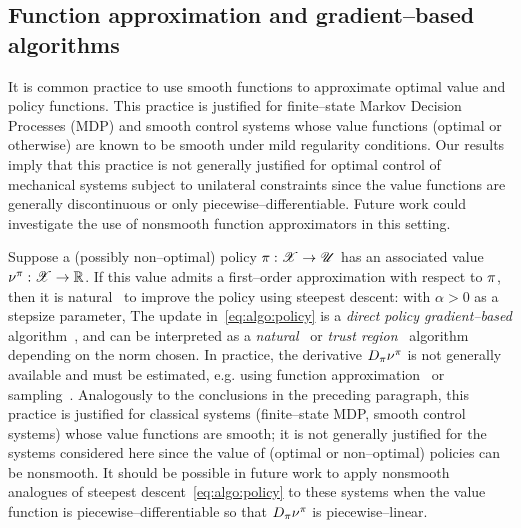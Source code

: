 \documentclass{article}
\begin{document}
\subsection{Function approximation and gradient--based algorithms}
\label{sec:disc:smooth}

It is common practice to use smooth functions to approximate optimal value and policy functions.
This practice is justified for finite--state Markov Decision Processes (MDP) and smooth control systems whose value functions (optimal or otherwise) are known to be smooth under mild regularity conditions.
Our results imply that this practice is not generally justified for optimal control of mechanical systems subject to unilateral constraints since the value functions are generally discontinuous or only piecewise--differentiable. Future work could investigate the use of nonsmooth function approximators in this setting. 

Suppose a (possibly non--optimal) policy 
$\pi:\mathscr{X}\rightarrow\mathscr{U}$ 
has an associated value
$\nu^\pi:\mathscr{X}\rightarrow\mathbb{R}$. 
If this value admits a first--order approximation with respect to $\pi$,
then it is natural%
~to improve the policy using steepest descent:
with $\alpha > 0$ as a stepsize parameter,
The update in~\eqref{eq:algo:policy} is a \emph{direct policy gradient--based} algorithm~\cite{Sutton2000-ap, Baxter2001-ua}, and can be interpreted as a \emph{natural}~\cite{Kakade2001-az} or \emph{trust region}~\cite{Schulman2015-kr} algorithm depending on the norm chosen.
In practice, the derivative $D_\pi\nu^\pi$ is not generally available and must be estimated, e.g. using function approximation~\cite{Doya2000-gk, Konda2003-av} or sampling~\cite{Baxter2001-ua, Silver2014-lj}.
Analogously to the conclusions in the preceding paragraph, 
this practice is justified for classical systems (finite--state MDP, smooth control systems) whose value functions are smooth;
it is not generally justified for the systems considered here since the value of (optimal or non--optimal) policies can be nonsmooth.
It should be possible in future work to apply nonsmooth analogues of steepest descent~\eqref{eq:algo:policy} to these systems when the value function is piecewise--differentiable so that $D_\pi\nu^\pi$ is piecewise--linear.
\end{document}
